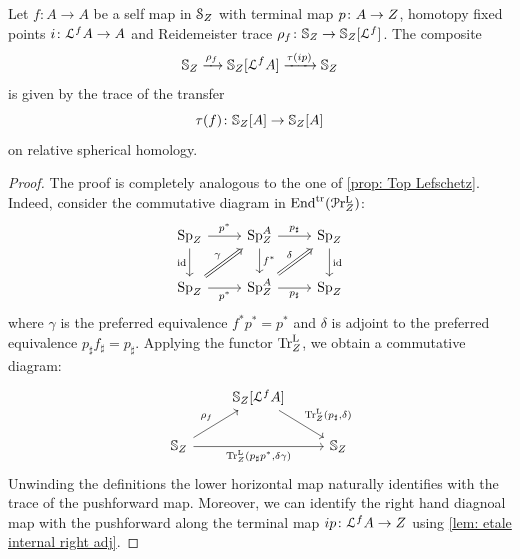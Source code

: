 \begin{prop}
    Let $f\colon A\to A$ be a self map in $\mathcal{S}_{Z}$ with
    terminal map $p\colon A\to Z$,
   homotopy fixed points $i\colon \mathcal{L}^fA \to A$
    and Reidemeister
    trace $\rho_f\colon \mathbb{S}_{Z}\to \mathbb{S}_{Z}[\mathcal{L}^f]$.
    The composite
    \[ \mathbb{S}_{Z}\xrightarrow{\rho_f} \mathbb{S}_{Z}[\mathcal{L}^fA] \xrightarrow{\tau(ip)} \mathbb{S}_{Z}\]
    is given by the trace of the transfer 
    \[ \tau(f)\colon \mathbb{S}_{Z}[A]\to \mathbb{S}_{Z}[A]\]
    on relative spherical homology.
\end{prop}
\begin{proof}
    The proof is completely analogous to the one of \cref{prop: Top Lefschetz}. Indeed, consider the commutative diagram in $\mathrm{End}^{\mathrm{tr}}(\mathcal{P}\mathrm{r}^{\mathrm{L}}_{Z})$:
    \[
   \begin{tikzcd}
	{\D{\base}} & {\pSp{\base}{A}} & {\D{\base}} \\
	{\D{\base}} & {\pSp{\base}{A}} & {\D{\base}}
	\arrow["{p^*}", from=1-1, to=1-2]
	\arrow["\id"', from=1-1, to=2-1]
	\arrow["{p_\sharp}", from=1-2, to=1-3]
	\arrow["{f^*}", from=1-2, to=2-2]
	\arrow["\id", from=1-3, to=2-3]
	\arrow["\gamma", Rightarrow, from=2-1, to=1-2]
	\arrow["{p^*}"', from=2-1, to=2-2]
	\arrow["\delta", Rightarrow, from=2-2, to=1-3]
	\arrow["{p_\sharp}"', from=2-2, to=2-3]
\end{tikzcd} 
    \]
where $\gamma$ is the preferred equivalence $f^{*}p^*=p^*$ and 
$\delta$ is adjoint to the preferred equivalence $p_\sharp f_{\sharp}= p_{\sharp}$. Applying the functor $\mathrm{Tr}^{\mathrm{L}}_{Z}$, we obtain a commutative diagram:
    \[\begin{tikzcd}
	{} & {\SS_{\base}[\cL^fA]} & \\
	{\SS_{\base}} && {\SS_{\base}}
	\arrow["{\TrcL(p_{\sharp},\delta})", from=1-2, to=2-3]
	\arrow["{\rho_f}", from=2-1, to=1-2]
	\arrow["{\TrcL(p_\sharp p^*, \delta\gamma)}"', from=2-1, to=2-3]
\end{tikzcd}\]
   Unwinding the definitions the lower horizontal map naturally identifies with the trace
   of the pushforward map. Moreover, we can identify the right hand
   diagnoal map with the pushforward along the terminal map 
   $ip\colon \mathcal{L}^fA\to Z$ using \cref{lem: etale internal right adj}.
\end{proof}